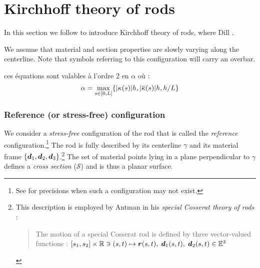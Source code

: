 \clearpage
\section{Kirchhoff theory of rods}

In this section we follow \cite{Dill1992} to introduce Kirchhoff theory of rods, where Dill .

We assume that material and section properties are slowly varying along the centerline.
Note that symbols referring to this configuration will carry an overbar.

ces équations sont valables à l'ordre 2 en $\alpha$ \cite{Coleman1993} où :
\begin{equation}
	\alpha = \max_{s \in [0,L]} \{ \abs{\kappa(s)} h, \abs{\overbar{\kappa}(s)} h, h/L\}
\end{equation}

\subsubsection{Reference (or stress-free) configuration}

We consider a \emph{stress-free} configuration of the rod that is called the \emph{reference} configuration.\footnote{See \cite[p.~20]{Audoly2010} for precisions when such a configuration may not exist.} The rod is fully described by its centerline ${\gamma}$ and its material frame $\{{\boldsymbol{d}_1}, {\boldsymbol{d}_2}, {\boldsymbol{d}_3}\}$.\footnote{This description is employed by Antman in his \emph{special Cosserat theory of rods} : \blockcquote[p.~270]{Antman2005}{The motion of a special Cosserat rod is defined by three vector-valued functions : $ [s_1, s_2] \times \mathbb{R} \ni  (s,t) \mapsto \boldsymbol{r}(s,t), \; \boldsymbol{d}_1 (s,t), \; \boldsymbol{d}_2 (s,t) \in \mathbb{E}^3$}.} The set of material points lying in a plane perpendicular to ${\gamma}$ defines a \emph{cross section} ($\mathcal{S}$) and is thus a planar surface. 

